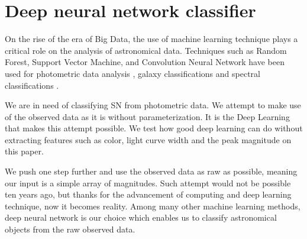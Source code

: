 \documentclass[useamsfonts]{pasj01}
\begin{document}
\section{Deep neural network classifier}
\label{sec:DNN}
On the rise of the era of Big Data, the use of machine learning technique plays a critical role on the analysis of astronomical data.  Techniques such as Random Forest, Support Vector Machine, and Convolution Neural Network have been used for photometric data analysis \citep{pasquet19a}, galaxy classifications \citep{hausen19a} and spectral 
classifications \citep{garciadias18a,muthukrishna19c,sharma20a}.

We are in need of classifying SN from photometric data.
We attempt to make use of the observed data as it is without parameterization.
It is the Deep Learning that makes this attempt possible.
We test how good deep learning can do without extracting features such as color, light curve width and the peak magnitude on this paper.

We push one step further and use the observed data as raw as possible, meaning our input is a simple array of magnitudes.  Such attempt would not be possible ten years ago, but thanks for the advancement of computing and deep learning technique, now it becomes reality.  Among many other machine learning methods, deep neural network is our choice which enables us to classify astronomical objects from the raw observed data. 
\end{document}
